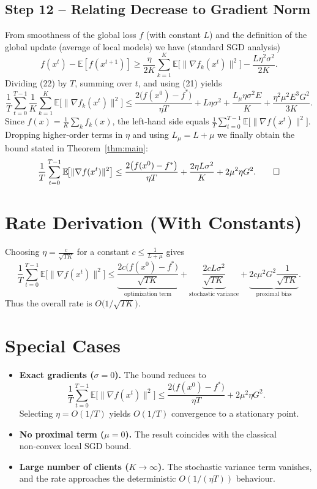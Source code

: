 \documentclass[11pt]{article}
\newcommand{\E}{\mathbb{E}}
\begin{document}
\subsection*{Step 12 – Relating Decrease to Gradient Norm}
From smoothness of the global loss $f$ (with constant $L$) and the definition of the global update (average of local models) we have (standard SGD analysis)
\[
    f(x^{t})- \E[f(x^{t+1})]
    \ge \frac{\eta}{2K}\sum_{k=1}^{K}\E\!\bigl[\|\nabla f_k(x^{t})\|^{2}\bigr]
    -\frac{L\eta^{2}\sigma^{2}}{2K}. \tag{22}
\]
Dividing (22) by $T$, summing over $t$, and using (21) yields
\[
    \frac{1}{T}\sum_{t=0}^{T-1}\frac{1}{K}\sum_{k=1}^{K}\E\!\bigl[\|\nabla f_k(x^{t})\|^{2}\bigr]
    \le
    \frac{2\bigl(f(x^{0})-f^{*}\bigr)}{\eta T}
    +L\eta\sigma^{2}
    +\frac{L_{\mu}\eta\sigma^{2}E}{K}
    +\frac{\eta^{2}\mu^{2}E^{3}G^{2}}{3K}. \tag{23}
\]
Since $f(x)=\frac{1}{K}\sum_{k}f_k(x)$, the left‑hand side equals $\frac{1}{T}\sum_{t=0}^{T-1}\E\!\bigl[\|\nabla f(x^{t})\|^{2}\bigr]$. Dropping higher‑order terms in $\eta$ and using $L_{\mu}=L+\mu$ we finally obtain the bound stated in Theorem~\ref{thm:main}:
\[
    \frac{1}{T}\sum_{t=0}^{T-1}\E\!\bigl[\|\nabla f(x^{t})\|^{2}\bigr]
    \le
    \frac{2\bigl(f(x^{0})-f^{*}\bigr)}{\eta T}
    +\frac{2\eta L\sigma^{2}}{K}
    +2\mu^{2}\eta G^{2}. \qedhere
\]

\section*{Rate Derivation (With Constants)}
Choosing $\eta=\frac{c}{\sqrt{TK}}$ for a constant $c\le\frac{1}{L+\mu}$ gives
\[
    \frac{1}{T}\sum_{t=0}^{T-1}\E\!\bigl[\|\nabla f(x^{t})\|^{2}\bigr]
    \le
    \underbrace{\frac{2c\bigl(f(x^{0})-f^{*}\bigr)}{\sqrt{TK}}}_{\text{optimization term}}
    +\underbrace{\frac{2cL\sigma^{2}}{\sqrt{TK}}}_{\text{stochastic variance}}
    +\underbrace{2c\mu^{2}G^{2}\frac{1}{\sqrt{TK}}}_{\text{proximal bias}}.
\]
Thus the overall rate is $O\!\bigl(1/\sqrt{TK}\bigr)$.

\section*{Special Cases}
\begin{itemize}
    \item \textbf{Exact gradients ($\sigma=0$).} The bound reduces to
    \[
        \frac{1}{T}\sum_{t=0}^{T-1}\E\!\bigl[\|\nabla f(x^{t})\|^{2}\bigr]
        \le \frac{2\bigl(f(x^{0})-f^{*}\bigr)}{\eta T}+2\mu^{2}\eta G^{2}.
    \]
    Selecting $\eta=O(1/T)$ yields $O(1/T)$ convergence to a stationary point.
    \item \textbf{No proximal term ($\mu=0$).} The result coincides with the classical non‑convex local SGD bound.
    \item \textbf{Large number of clients ($K\to\infty$).} The stochastic variance term vanishes, and the rate approaches the deterministic $O(1/(\eta T))$ behaviour.
\end{itemize}
\end{document}

